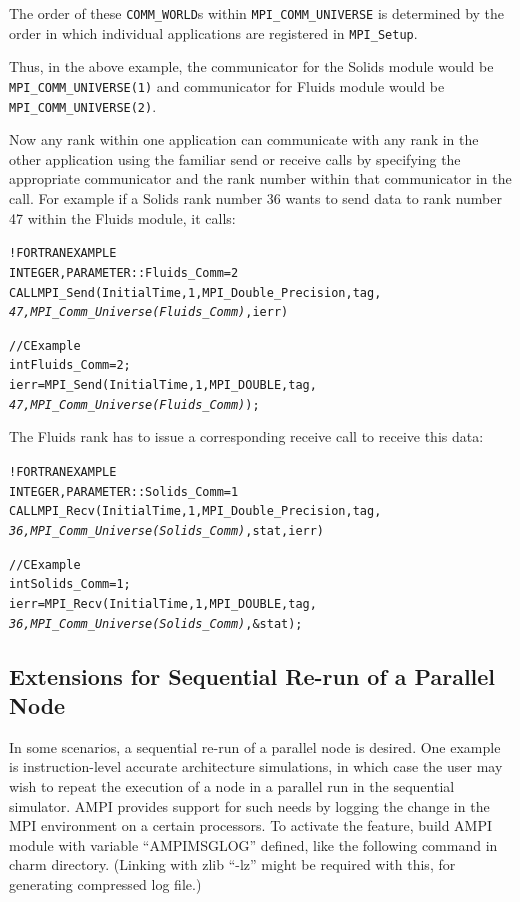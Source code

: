 \documentclass[10pt]{article}
\begin{document}
The order of these \texttt{COMM\_WORLD}s within \texttt{MPI\_COMM\_UNIVERSE}
is determined by the order in which individual applications are registered in
\texttt{MPI\_Setup}.

Thus, in the above example, the communicator for the Solids module would be
\texttt{MPI\_COMM\_UNIVERSE(1)} and communicator for Fluids module would be
\texttt{MPI\_COMM\_UNIVERSE(2)}.

Now any rank within one application can communicate with any rank in the
other application using the familiar send or receive \ampi{} calls by
specifying the appropriate communicator and the rank number within that
communicator in the call. For example if a Solids rank number 36 wants to send
data to rank number 47 within the Fluids module, it calls:

\begin{alltt}
!FORTRAN EXAMPLE
INTEGER , PARAMETER :: Fluids_Comm = 2
CALL MPI_Send(InitialTime, 1, MPI_Double_Precision, tag, 
              \emph{47, MPI_Comm_Universe(Fluids_Comm)}, ierr)

//C Example
int Fluids_Comm = 2;
ierr = MPI_Send(InitialTime, 1, MPI_DOUBLE, tag,
                \emph{47, MPI_Comm_Universe(Fluids_Comm)});
\end{alltt}

The Fluids rank has to issue a corresponding receive call to receive this
data:

\begin{alltt}
!FORTRAN EXAMPLE
INTEGER , PARAMETER :: Solids_Comm = 1
CALL MPI_Recv(InitialTime, 1, MPI_Double_Precision, tag, 
              \emph{36, MPI_Comm_Universe(Solids_Comm)}, stat, ierr)

//C Example
int Solids_Comm = 1;
ierr = MPI_Recv(InitialTime, 1, MPI_DOUBLE, tag,
                \emph{36, MPI_Comm_Universe(Solids_Comm)}, &stat);
\end{alltt}

\subsection{Extensions for Sequential Re-run of a Parallel Node}
In some scenarios, a sequential re-run of a parallel node is desired. One
example is instruction-level accurate architecture simulations, in which case
the user may wish to repeat the execution of a node in a parallel run in the
sequential simulator. AMPI provides support for such needs by logging the change
in the MPI environment on a certain processors. To activate the feature, build
AMPI module with variable ``AMPIMSGLOG'' defined, like the following command in
charm directory. (Linking with zlib ``-lz'' might be required with this, for
generating compressed log file.)
\end{document}
